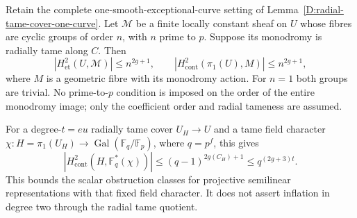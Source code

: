 \begin{lemma}
\label{D:radial-tame-cyclic-H2}
Retain the complete one-smooth-exceptional-curve setting of
Lemma~\ref{D:radial-tame-cover-one-curve}. Let $\mathcal M$
be a finite locally constant sheaf on $U$ whose fibres are
cyclic groups of order $n$, with $n$ prime to $p$. Suppose
its monodromy is radially tame along $C$. Then
\[
 |H^2_{\mathrm{et}}(U,\mathcal M)|\leq n^{2g+1},\qquad
 |H^2_{\mathrm{cont}}(\pi_1(U),M)|\leq n^{2g+1},
                                                        \tag{D.T2.1}
\]
where $M$ is a geometric fibre with its monodromy action.
For $n=1$ both groups are trivial. No prime-to-$p$
condition is imposed on the order of the entire monodromy
image; only the coefficient order and radial tameness
are assumed.

For a degree-$t=eu$ radially tame cover $U_H\to U$
and a tame field character
$\chi:H=\pi_1(U_H)\to\operatorname{Gal}(\mathbb F_q/\mathbb F_p)$,
where $q=p^f$, this gives
\[
 |H^2_{\mathrm{cont}}(H,\mathbb F_q^*(\chi))|
       \leq(q-1)^{2g(C_H)+1}\leq q^{(2g+3)t}.
                                                        \tag{D.T2.2}
\]
This bounds the scalar obstruction classes for projective
semilinear representations with that fixed field character.
It does not assert inflation in degree two through the
radial tame quotient.
\end{lemma}

